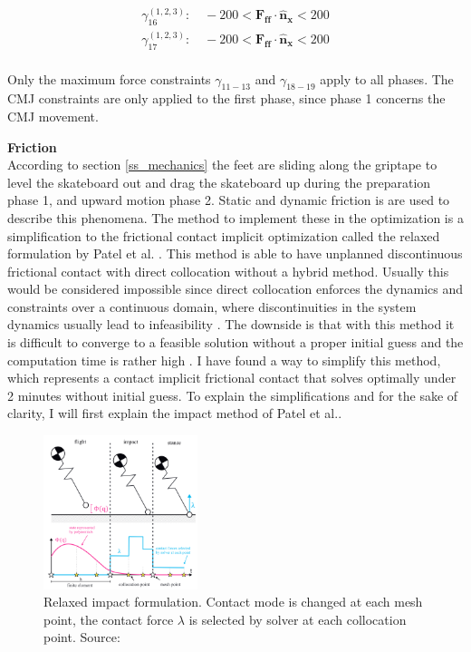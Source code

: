 \documentclass[default,iicol]{sn-jnl}
\theoremstyle{thmstyleone}%
\theoremstyle{thmstyletwo}%
\theoremstyle{thmstylethree}%
\begin{document}
\begin{equation}
    \begin{array}{c}
         \gamma_{16}^{(1,2,3)}:\quad  -200 < \mathbf{F_{ff}}\cdot \mathbf{\hat n_x} < 200  \\
         \gamma_{17}^{(1,2,3)}: \quad -200 < \mathbf{F_{ff}}\cdot \mathbf{\hat n_x} < 200 \\ 
    \end{array}
\end{equation}

Only the maximum force constraints $\gamma_{11-13}$ and $\gamma_{18-19}$ apply to all phases. The CMJ constraints are only applied to the first phase, since phase 1 concerns the CMJ movement. 

\textbf{Friction}\\
According to section \ref{ss_mechanics} the feet are sliding along the griptape to level the skateboard out and drag the skateboard up during the preparation phase 1, and upward motion phase 2. Static and dynamic friction is are used to describe this phenomena. The method to implement these in the optimization is a simplification to the frictional contact implicit optimization called the relaxed formulation by Patel et al. \cite{patel_contact-implicit_2019}. This method is able to have unplanned discontinuous frictional contact with direct collocation without a hybrid method. Usually this would be considered impossible since direct collocation enforces the dynamics and constraints over a continuous domain, where discontinuities in the system dynamics usually lead to infeasibility \cite{kelly_transcription_2017}. The downside is that with this method it is difficult to converge to a feasible solution without a proper initial guess and the computation time is rather high \cite{shield_contact-implicit_2022,patel_contact-implicit_2019}. I have found a way to simplify this method, which represents a contact implicit frictional contact that solves optimally under 2 minutes without initial guess. To explain the simplifications and for the sake of clarity, I will first explain the impact method of Patel et al..

\begin{figure}
\centerline{\includegraphics[width=0.4\textwidth]{figure/relaxed_method.png}}
\caption[Relaxed impact method]{Relaxed impact formulation. Contact mode is changed at each mesh point, the contact force $\lambda$ is selected by solver at each collocation point. Source: \cite{patel_contact-implicit_2019}}
\label{f_relaxed}
\end{figure}
\end{document}
